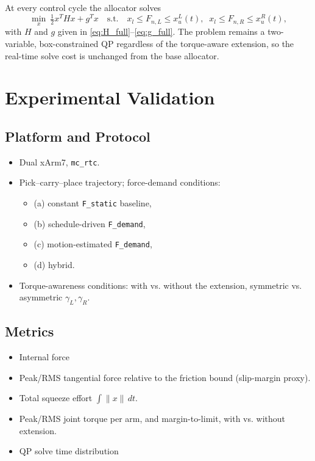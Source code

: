 \documentclass[conference]{IEEEtran}
\begin{document}
At every control cycle the allocator solves
\begin{equation}
\min_{x}\ \tfrac{1}{2}x^{T}Hx+g^{T}x
\quad\text{s.t.}\quad
x_l \le F_{n,L} \le x_u^L(t),\;\;
x_l \le F_{n,R} \le x_u^R(t),
\end{equation}
with $H$ and $g$ given in \eqref{eq:H_full}–\eqref{eq:g_full}. The problem remains a two-variable, box-constrained QP regardless of the torque-aware extension, so the real-time solve cost is unchanged from the base allocator.







\section{Experimental Validation}



\subsection{Platform and Protocol}

\begin{itemize}
    \item Dual xArm7, \texttt{mc\_rtc}.

    \item Pick--carry--place trajectory; force-demand conditions:
    \begin{itemize}
        \item (a) constant \texttt{F\_static} baseline,
        \item (b) schedule-driven \texttt{F\_demand},
        \item (c) motion-estimated \texttt{F\_demand},
        \item (d) hybrid.
    \end{itemize}

    \item Torque-awareness conditions: with vs. without the extension, symmetric vs. asymmetric \(\gamma_L,\gamma_R\).

\end{itemize}

\subsection{Metrics}

\begin{itemize}
    \item Internal force
    \item Peak/RMS tangential force relative to the friction bound (slip-margin proxy).
    \item Total squeeze effort \(\int \lVert x\rVert\,dt\).
    \item Peak/RMS joint torque per arm, and margin-to-limit, with vs. without extension.
    \item QP solve time distribution
\end{itemize}
\end{document}
